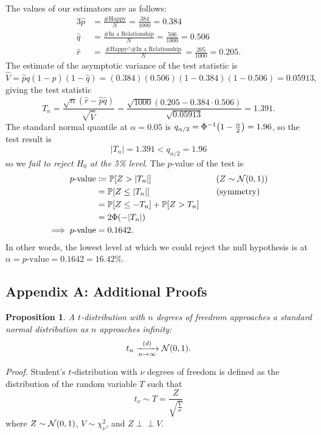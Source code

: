 \documentclass[letterpaper, oneside, reqno]{amsart}
\newtheorem{prop}{Proposition}[section]
\numberwithin{equation}{section}
\newcommand{\ddfrac}[2]{\frac{\displaystyle #1}{\displaystyle #2}}
\newcommand{\Prob}[1]{\mathbb{P}\mleft[#1\mright]}
\newcommand{\N}[2]{\mathcal{N}\mleft( #1, #2 \mright)}
\newcommand{\indep}{\perp \!\!\! \perp}  %
\newcommand{\by}[1]{&\quad&\text{(#1)}}
\newcommand{\Dlim}{\xrightarrow[n \to \infty]{(d)}}
\newcommand{\phat}{\hat{p}}
\newcommand{\qhat}{\hat{q}}
\newcommand{\rhat}{\hat{r}}
\begin{document}
The values of our estimators are as follows:
\begin{alignat*}{3}
  \phat &= \frac{\text{\# Happy}}{N} = \frac{384}{1000} = 0.384 \\
  \qhat &= \frac{\text{\# In a Relationship}}{N} = \frac{506}{1000} = 0.506 \\
  \rhat &= \frac{\text{\# Happy} \cap \text{\# In a Relationship}}{N} = \frac{205}{1000} = 0.205.
\end{alignat*}
The estimate of the asymptotic variance of the test statistic is
\[ \hat{V} = \phat\qhat(1-\phat)(1-\qhat) = (0.384)(0.506)(1 - 0.384)(1 - 0.506)
  = 0.05913, \]
giving the test statistic
\[ T_n = \frac{\sqrt{n}(\rhat - \phat\qhat)}{\sqrt{\hat{V}}}
  = \frac{\sqrt{1000}(0.205 - 0.384\cdot0.506)}{\sqrt{0.05913}} = 1.391. \]
The standard normal quantile at $\alpha = 0.05$ is $q_{\alpha/2}
= \Phi^{-1}\mleft(1
- \frac{\alpha}{2}\mright) = 1.96$, so the test result is
\[ |T_n| = 1.391 < q_{\alpha/2} = 1.96 \]
so we \emph{fail to reject $H_0$ at the 5\% level}. The $p$-value of the test is
\begin{alignat*}{3}
  \text{$p$-value} &\coloneqq \Prob{Z > |T_n|} \by{$Z \sim \N{0}{1}$}  \\
                   &= \Prob{Z \le |T_n|} \by{symmetry} \\
                   &= \Prob{Z \le -T_n} + \Prob{Z > T_n} \\
                   &= 2\Phi(-|T_n|) \\
  \implies \text{$p$-value} &= 0.1642.
\end{alignat*}
In other words, the lowest level at which we could reject the null hypothesis is
at $\alpha = \text{$p$-value} = 0.1642 = 16.42\%$.

\clearpage
\subsection*{Appendix A: Additional Proofs} \label{app:t_to_N}
\begin{prop}
  A $t$-distribution with $n$ degrees of freedrom approaches a standard normal
  distribution as $n$ approaches infinity:
  \[ t_n \Dlim \N{0}{1}. \]
\end{prop}

\emph{Proof.}
Student's $t$-distribution with $\nu$ degrees of freedom is defined as the
distribution of the random variable $T$ such that
\[ t_{\nu} \sim T = \ddfrac{Z}{\sqrt{\frac{V}{\nu}}} \]
where $Z \sim \N{0}{1}$, $V \sim \chi^2_{\nu}$, and $Z \indep V$.
\end{document}
